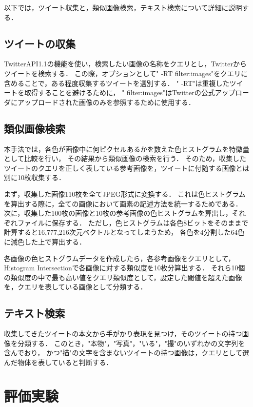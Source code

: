 以下では，ツイート収集と，類似画像検索，テキスト検索について詳細に説明する．

\section{ツイートの収集}
TwitterAPI1.1の機能を使い，検索したい画像の名称をクエリとし，Twitterからツイートを検索する．
この際，オプションとして" -RT filter:images"をクエリに含めることで，ある程度収集するツイートを選別する．
" -RT"は重複したツイートを取得することを避けるために，
" filter:images"はTwitterの公式アップローダにアップロードされた画像のみを参照するために使用する．

\section{類似画像検索}
本手法では，各色が画像中に何ピクセルあるかを数えた色ヒストグラムを特徴量として比較を行い，
その結果から類似画像の検索を行う．
そのため，収集したツイートのクエリを正しく表している参考画像を，ツイートに付随する画像とは別に10枚収集する．

まず，収集した画像110枚を全てJPEG形式に変換する．
これは色ヒストグラムを算出する際に，全ての画像において画素の記述方法を統一するためである．
次に，収集した100枚の画像と10枚の参考画像の色ヒストグラムを算出し，それぞれファイルに保存する．
ただし，色ヒストグラムは各色8ビットをそのままで計算すると16,777,216次元ベクトルとなってしまうため，
各色を4分割した64色に減色した上で算出する．

各画像の色ヒストグラムデータを作成したら，各参考画像をクエリとして，
Histogram Intersectionで各画像に対する類似度を10枚分算出する．
それら10個の類似度の中で最も高い値をクエリ類似度として，設定した閾値を超えた画像を，クエリを表している画像として分類する．
\section{テキスト検索}
収集してきたツイートの本文から手がかり表現を見つけ，そのツイートの持つ画像を分類する．
このとき，"本物"，"写真"，"いる"，"撮"のいずれかの文字列を含んでおり，
かつ"描"の文字を含まないツイートの持つ画像は，クエリとして選んだ物体を表していると判断する．

\chapter{評価実験}
\label{sec:experiment}

